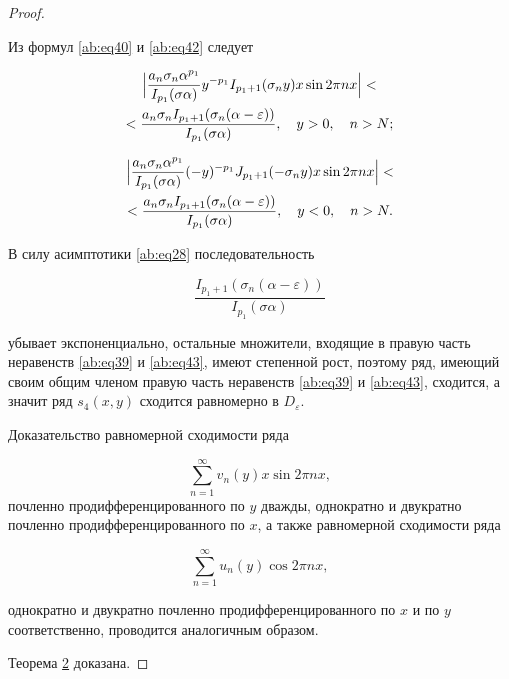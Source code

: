 \begin{proof}
\begin{equation}
\end{equation}



Из формул \eqref{ab:eq40} и \eqref{ab:eq42} следует 

\begin{multline}

\label{ab:eq39}

\Bigl|\frac{a_n\sigma_n\alpha^{p_1}}{I_{p_1}(\sigma\alpha)}y^{-p_1}I_{p_1+1}(\sigma_ny)x\sin2\pi nx\Bigr|< \\

<\frac{a_n\sigma_nI_{p_1+1}(\sigma_n(\alpha-\varepsilon))}{I_{p_1}(\sigma\alpha)},\quad y>0, \quad n> N;

\end{multline}

\begin{multline}

\label{ab:eq43}

\Bigl|\frac{a_n\sigma_n\alpha^{p_1}}{I_{p_1}(\sigma\alpha)}(-y)^{-p_1}J_{p_1+1}(-\sigma_ny)x\sin2\pi nx\Bigr|<\\

<\frac{a_n\sigma_nI_{p_1+1}(\sigma_n(\alpha-\varepsilon))}{I_{p_1}(\sigma\alpha)},\quad y<0,\quad n>N.

\end{multline}



В силу асимптотики \eqref{ab:eq28} последовательность 

$$\frac{I_{p_1+1}(\sigma_n(\alpha-\varepsilon))}{I_{p_1}(\sigma\alpha)}$$ 

убывает экспоненциально, остальные множители, входящие в правую часть неравенств \eqref{ab:eq39} и \eqref{ab:eq43}, имеют степенной рост, поэтому ряд, имеющий своим общим членом правую часть неравенств \eqref{ab:eq39} и \eqref{ab:eq43}, сходится, а значит ряд $s_4(x,y)$ сходится равномерно в $D_{\varepsilon}$.



Доказательство равномерной сходимости ряда 

$$\sum\limits_{n=1}^{\infty}v_n(y)x\sin2\pi nx,$$ почленно продифференцированного по $y$ дважды, однократно и двукратно почленно продифференцированного по $x$, а также равномерной сходимости ряда 

$$\sum\limits_{n=1}^{\infty}u_n(y)\cos2\pi nx,$$ 

однократно и двукратно почленно продифференцированного по $x$ и по $y$ соответственно, проводится аналогичным образом. 



Теорема \hyperlink{ab:th2}{2} доказана.

\end{proof}







